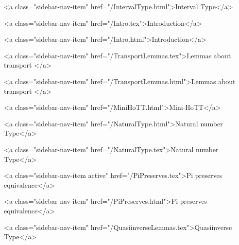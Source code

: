       
    
      
        
          <a class="sidebar-nav-item" href="/IntervalType.html">Interval Type</a>
        
      
    
      
        
          <a class="sidebar-nav-item" href="/Intro.tex">Introduction</a>
        
      
    
      
        
          <a class="sidebar-nav-item" href="/Intro.html">Introduction</a>
        
      
    
      
        
          <a class="sidebar-nav-item" href="/TransportLemmas.tex">Lemmas about transport </a>
        
      
    
      
        
          <a class="sidebar-nav-item" href="/TransportLemmas.html">Lemmas about transport </a>
        
      
    
      
        
          <a class="sidebar-nav-item" href="/MiniHoTT.html">Mini-HoTT</a>
        
      
    
      
        
          <a class="sidebar-nav-item" href="/NaturalType.html">Natural number Type</a>
        
      
    
      
        
          <a class="sidebar-nav-item" href="/NaturalType.tex">Natural number Type</a>
        
      
    
      
        
          <a class="sidebar-nav-item active" href="/PiPreserves.tex">Pi preserves equivalence</a>
        
      
    
      
        
          <a class="sidebar-nav-item" href="/PiPreserves.html">Pi preserves equivalence</a>
        
      
    
      
        
          <a class="sidebar-nav-item" href="/QuasiinverseLemmas.tex">Quasiinverse Type</a>
        
